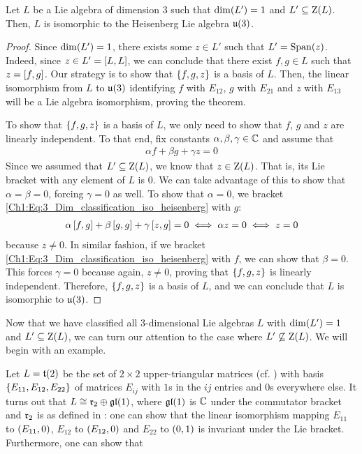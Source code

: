\begin{boxtheorem}
    Let $L$ be a Lie algebra of dimension $3$ such that $\dim\!\left( L' \right) = 1$ and $L' \subseteq \operatorname{Z}\!\left( L \right)$. Then, $L$ is isomorphic to the Heisenberg Lie algebra $\mathfrak{u}\!\left( 3 \right)$.
\end{boxtheorem}
\begin{proof}
    Since $\dim\!\left( L' \right) = 1$, there exists some $z \in L'$ such that $L' = \operatorname{Span}\!\left( z \right)$. Indeed, since $z \in L' = \left[ L, L \right]$, we can conclude that there exist $f, g \in L$ such that $z = \left[ f, g \right]$. Our strategy is to show that $\left\{ f, g, z \right\}$ is a basis of $L$. Then, the linear isomorphism from $L$ to $\mathfrak{u}\!\left( 3 \right)$ identifying $f$ with $E_{12}$, $g$ with $E_{21}$ and $z$ with $E_{13}$ will be a Lie algebra isomorphism, proving the theorem.

    To show that $\left\{ f, g, z \right\}$ is a basis of $L$, we only need to show that $f$, $g$ and $z$ are linearly independent. To that end, fix constants $\alpha, \beta, \gamma \in \mathbb{C}$ and assume that
    \begin{align}
        \alpha f + \beta g + \gamma z = 0
        \label{Ch1:Eq:3_Dim_classification_iso_heisenberg}
    \end{align}
    Since we assumed that $L' \subseteq \operatorname{Z}\!\left( L \right)$, we know that $z \in \operatorname{Z}\!\left( L \right)$. That is, its Lie bracket with any element of $L$ is $0$. We can take advantage of this to show that $\alpha = \beta = 0$, forcing $\gamma = 0$ as well. To show that $\alpha = 0$, we bracket \eqref{Ch1:Eq:3_Dim_classification_iso_heisenberg} with $g$:
    \begin{align*}
        \alpha \left[ f, g \right] + \beta \left[ g, g \right] + \gamma \left[ z, g \right] = 0 \iff \alpha z = 0 \iff z = 0
    \end{align*}
    because $z \neq 0$. In similar fashion, if we bracket \eqref{Ch1:Eq:3_Dim_classification_iso_heisenberg} with $f$, we can show that $\beta = 0$. This forces $\gamma = 0$ because again, $z \neq 0$, proving that $\left\{ f, g, z \right\}$ is linearly independent. Therefore, $\left\{ f, g, z \right\}$ is a basis of $L$, and we can conclude that $L$ is isomorphic to $\mathfrak{u}\!\left( 3 \right)$.
\end{proof}

Now that we have classified all $3$-dimensional Lie algebras $L$ with $\dim\!\left( L' \right) = 1$ and $L' \subseteq \operatorname{Z}\!\left( L \right)$, we can turn our attention to the case where $L' \not\subseteq \operatorname{Z}\!\left( L \right)$. We will begin with an example.

\begin{boxexample}\label{Ch1:Eg:3D_Nonabelian_Derived_not_subset_Z}
    Let $L = \mathfrak{t}\!\left( 2 \right)$ be the set of $2 \times 2$ upper-triangular matrices (cf. ) with basis $\left\{ E_{11}, E_{12}, E_{22} \right\}$ of matrices $E_{ij}$ with $1$s in the $ij$ entries and $0$s everywhere else. It turns out that $L \cong \mathfrak{r}_2 \oplus \mathfrak{gl}\!\left( 1 \right)$, where $\mathfrak{gl}\!\left( 1 \right)$ is $\mathbb{C}$ under the commutator bracket and $\mathfrak{r}_2$ is as defined in : one can show that the linear isomorphism mapping $E_{11}$ to $\left( E_{11}, 0 \right)$, $E_{12}$ to $\left( E_{12}, 0 \right)$ and $E_{22}$ to $\left( 0, 1 \right)$ is invariant under the Lie bracket. Furthermore, one can show that 
\end{boxexample}

\sorry
